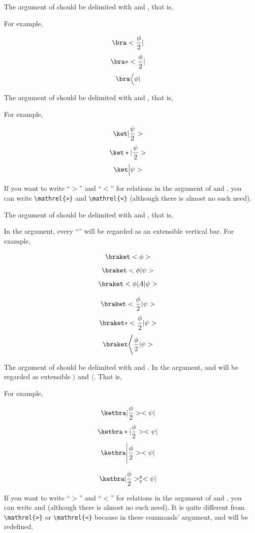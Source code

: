 \documentclass[11pt,letterpaper]{article}
\begin{document}
The argument of  should be delimited with \opt{<} and \opt{|}, that is,
\begin{center}
 \opt{<}  \opt{|}
\end{center}
For example,
\begin{example}
\[ \bra < \frac \phi 2 | \]
\[ \bra*< \frac \phi 2 | \]
\[ \bra\Big< \phi  |     \]
\end{example}
The argument of  should be delimited with \opt{|} and \opt{>}, that is,
\begin{center}
 \opt{|}  \opt{>}
\end{center}
For example,
\begin{example}
\[ \ket | \frac \psi 2 > \]
\[ \ket*| \frac \psi 2 > \]
\[ \ket\Big| \psi >      \]
\end{example}
\pardanger
If you want to write ``$>$'' and ``$<$'' for relations in the argument of
 and , you can write \verb|\mathrel{>}| and \verb|\mathrel{<}|
(although there is almost no such need).

The argument of  should be delimited with \opt{<} and \opt{>},
that is,
\begin{center}
 \opt{<}  \opt{>}
\end{center}
In the  argument, every ``\opt{|}'' will be regarded as an
extensible vertical bar. For example,
\begin{example}
\[ \braket< \phi >            \]
\[ \braket< \phi | \psi >     \]
\[ \braket< \phi | A | \psi > \]
\end{example}
\begin{example}
\def\0{\frac\phi2}
\[ \braket     < \0 | \psi >  \]
\[ \braket*    < \0 | \psi >  \]
\[ \braket\Bigg< \0 | \psi >  \]
\end{example}
The argument of  should be delimited with \opt{|} and \opt{|}.
In the argument, \opt{>} and \opt{<} will be regarded as extensible $\rangle$
and $\langle$. That is,
\begin{center}
 \opt{|}  \opt{>} 
  \opt{<}  \opt{|}
\end{center}
For example,
\begin{example}
\def\0{\frac\phi2}
\[ \ketbra     | \0 >< \psi | \]
\[ \ketbra*    | \0 >< \psi | \]
\[ \ketbra\Bigg| \0 >< \psi | \]
\end{example}
\begin{example}
\def\0{\frac\phi2}
\[ \ketbra| \0 >_x^y < \psi | \]
\end{example}
\pardanger
If you want to write ``$>$'' and ``$<$'' for relations in the argument of
 and , you can write \cs{>} and \cs{<} (although there
is almost no such need). It is quite different from \verb|\mathrel{>}| or
\verb|\mathrel{<}| because in these commands' argument, \opt{>} and \opt{<}
will be redefined.
\end{document}
